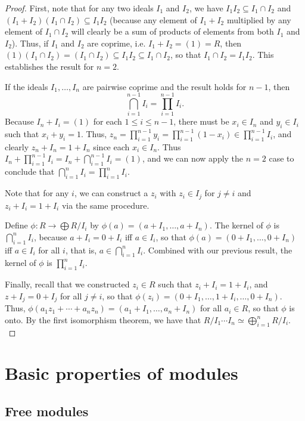\begin{proof} 
First, note that for any two ideals $I_1$ and $I_2$, we
have $I_1I_2\subseteq I_1\cap I_2$ and $(I_1+I_2)(I_1\cap I_2)\subseteq
I_1I_2$ (because any element of $I_1+I_2$ multiplied by any element of
$I_1\cap I_2$ will clearly be a sum of products of elements from both $I_1$
and $I_2$). Thus, if $I_1$ and $I_2$ are coprime, i.e. $I_1+I_2=(1)=R$,
then $(1)(I_1\cap I_2)=(I_1\cap I_2)\subseteq I_1I_2\subseteq I_1\cap I_2$,
so that $I_1\cap I_2=I_1I_2$. This establishes the result for $n=2$.

If the
ideals $I_1,\ldots,I_n$ are pairwise coprime and the result holds for $n-1$,
then $$\bigcap_{i=1}^{n-1} I_i=\prod_{i=1}^{n-1}I_i.$$  Because $I_n+I_i=(1)$
for each $1\leq i\leq n-1$, there must be $x_i\in I_n$ and $y_i\in I_i$ such
that $x_i+y_i=1$. Thus, $z_n=\prod_{i=1}^{n-1}y_i=\prod_{i=1}^{n-1}(1-x_i)\in
\prod_{i=1}^{n-1} I_i$, and clearly $z_n+I_n=1+I_n$ since each $x_i\in
I_n$. Thus $I_n+\prod_{i=1}^{n-1}I_i=I_n+\bigcap_{i=1}^{n-1}I_i=(1)$,
and we can now apply the $n=2$ case to conclude that $\bigcap_{i=1}^n
I_i=\prod_{i=1}^n I_i$. 

Note that for any $i$, we can construct a $z_i$
with $z_i\in I_j$ for $j\neq i$ and $z_i+I_i=1+I_i$ via the same procedure.

 Define $\phi:R\rightarrow\bigoplus R/I_i$
by $\phi(a)=(a+I_1,\ldots,a+I_n)$. The kernel of $\phi$ is
$\bigcap_{i=1}^n I_i$, because $a+I_i=0+I_i$ iff $a\in I_i$, so that
$\phi(a)=(0+I_1,\ldots,0+I_n)$ iff $a\in I_i$ for all $i$, that is,
$a\in\bigcap_{i=1}^n I_i$. Combined with our previous result, the kernel
of $\phi$ is $\prod_{i=1}^n I_i$.

Finally, recall that we constructed
$z_i\in R$ such that $z_i+I_i=1+I_i$, and $z+I_j=0+I_j$ for all $j\neq
i$, so that $\phi(z_i)=(0+I_1,\ldots,1+I_{i},\ldots,0+I_n)$. Thus,
$\phi(a_1z_1+\cdots+a_nz_n)=(a_1+I_1,\ldots,a_n+I_n)$ for all $a_i\in R$,
so that $\phi$ is onto. By the first isomorphism theorem, we have that
$R/I_1\cdots I_n\simeq \bigoplus_{i=1}^nR/I_i$.   \\

\end{proof} 

\section{Basic properties of modules}

\subsection{Free modules}


